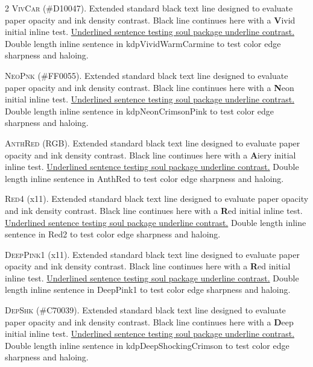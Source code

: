 \begin{multicols}{2}
\lettrine[lines=2]{\textcolor{kdpVividWarmCarmine}{V}}{ivCar} (\#D10047). Extended standard black text line designed to evaluate paper opacity and ink density contrast. Black line continues here with a \textbf{\textcolor{kdpVividWarmCarmine}{V}}ivid initial inline test. \ul{Underlined sentence testing soul package underline contrast.} \textcolor{kdpVividWarmCarmine}{Double length inline sentence in kdpVividWarmCarmine to test color edge sharpness and haloing.}


\lettrine[lines=2]{\textcolor{kdpNeonCrimsonPink}{N}}{eoPnk} (\#FF0055). Extended standard black text line designed to evaluate paper opacity and ink density contrast. Black line continues here with a \textbf{\textcolor{kdpNeonCrimsonPink}{N}}eon initial inline test. \ul{Underlined sentence testing soul package underline contrast.} \textcolor{kdpNeonCrimsonPink}{Double length inline sentence in kdpNeonCrimsonPink to test color edge sharpness and haloing.}


\lettrine[lines=2]{\textcolor{AnthRed}{A}}{nthRed} (RGB). Extended standard black text line designed to evaluate paper opacity and ink density contrast. Black line continues here with a \textbf{\textcolor{AnthRed}{A}}iery initial inline test. \ul{Underlined sentence testing soul package underline contrast.} \textcolor{AnthRed}{Double length inline sentence in AnthRed to test color edge sharpness and haloing.}


\lettrine[lines=2]{\textcolor{Red4}{R}}{ed4} (x11). Extended standard black text line designed to evaluate paper opacity and ink density contrast. Black line continues here with a \textbf{\textcolor{Red4}{R}}ed initial inline test. \ul{Underlined sentence testing soul package underline contrast.} \textcolor{Red4}{Double length inline sentence in Red2 to test color edge sharpness and haloing.}


\lettrine[lines=2]{\textcolor{DeepPink1}{D}}{eepPink1} (x11). Extended standard black text line designed to evaluate paper opacity and ink density contrast. Black line continues here with a \textbf{\textcolor{DeepPink1}{R}}ed initial inline test. \ul{Underlined sentence testing soul package underline contrast.} \textcolor{DeepPink1}{Double length inline sentence in DeepPink1 to test color edge sharpness and haloing.}


\lettrine[lines=2]{\textcolor{kdpDeepShockingCrimson}{D}}{epShk} (\#C70039). Extended standard black text line designed to evaluate paper opacity and ink density contrast. Black line continues here with a \textbf{\textcolor{kdpDeepShockingCrimson}{D}}eep initial inline test. \ul{Underlined sentence testing soul package underline contrast.} \textcolor{kdpDeepShockingCrimson}{Double length inline sentence in kdpDeepShockingCrimson to test color edge sharpness and haloing.}



\end{multicols}
